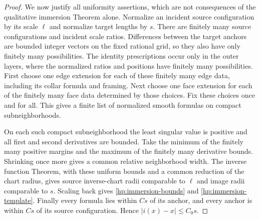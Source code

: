 \documentclass[11pt]{article}
\numberwithin{equation}{section}
\theoremstyle{definition}
\theoremstyle{remark}
\begin{document}
\begin{proof}
We now justify all uniformity assertions, which are not consequences
of the qualitative immersion Theorem alone.  Normalize an incident
source configuration by its scale $\ell$ and normalize target lengths
by $s$.  There are finitely many source configurations and incident
scale ratios.  Differences between the target anchors are bounded
integer vectors on the fixed rational grid, so they also have only
finitely many possibilities.  The identity prescriptions occur only
in the outer layers, where the normalized ratios and positions have
finitely many possibilities.  First choose one edge extension for each
of these finitely many edge data, including its collar formula and
framing.  Next choose one face extension for each of the finitely many
face data determined by those choices.  Fix these choices once and
for all.  This gives a finite list of normalized smooth formulas on
compact subneighborhoods.

On each such compact subneighborhood the least singular value is
positive and all first and second derivatives are bounded.  Take the
minimum of the finitely many positive margins and the maximum of the
finitely many derivative bounds.  Shrinking once more gives a common
relative neighborhood width.  The inverse function Theorem, with
these uniform bounds and a common reduction of the chart radius,
gives source inverse-chart radii comparable to $\ell$ and image radii
comparable to $s$.  Scaling back gives
\eqref{hp:immersion-bounds} and
\eqref{hp:immersion-template}.  Finally every formula lies within
$Cs$ of its anchor, and every anchor is within $Cs$ of its source
configuration.  Hence $|i(x)-x|\leq C_0s$.
\end{proof}
\end{document}
